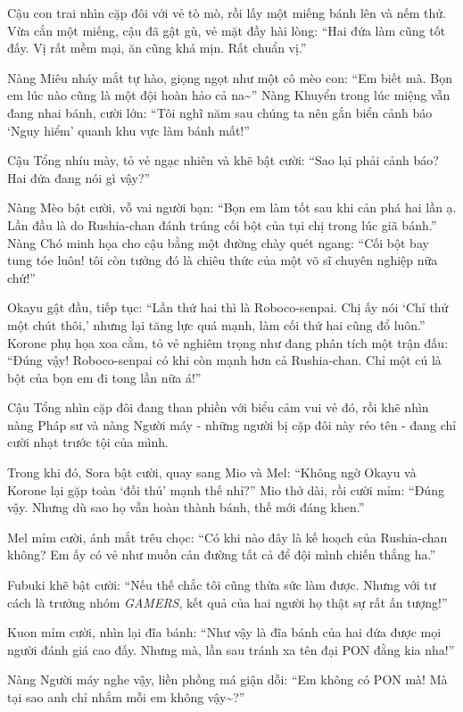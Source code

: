\documentclass[../main.tex]{subfiles}
\begin{document}
Cậu con trai nhìn cặp đôi với vẻ tò mò, rồi lấy một miếng bánh lên và nếm thử. Vừa cắn một miếng, cậu đã gật gù, vẻ mặt đầy hài lòng: ``Hai đứa làm cũng tốt đấy. Vị rất mềm mại, ăn cũng khá mịn. Rất chuẩn vị.''

Nàng Miêu nháy mắt tự hào, giọng ngọt như một cô mèo con: ``Em biết mà. Bọn em lúc nào cũng là một đội hoàn hảo cả na\~{}'' Nàng Khuyển trong lúc miệng vẫn đang nhai bánh, cười lớn: ``Tôi nghĩ năm sau chúng ta nên gắn biển cảnh báo `Nguy hiểm' quanh khu vực làm bánh mất!''

Cậu Tổng nhíu mày, tỏ vẻ ngạc nhiên và khẽ bật cười: ``Sao lại phải cảnh báo? Hai đứa đang nói gì vậy?''

Nàng Mèo bật cười, vỗ vai người bạn: ``Bọn em làm tốt sau khi cản phá hai lần ạ. Lần đầu là do Rushia-chan đánh trúng cối bột của tụi chị trong lúc giã bánh.'' Nàng Chó minh họa cho cậu bằng một đường chày quét ngang: ``Cối bột bay tung tóe luôn! tôi còn tưởng đó là chiêu thức của một võ sĩ chuyên nghiệp nữa chứ!''

Okayu gật đầu, tiếp tục: ``Lần thứ hai thì là Roboco-senpai. Chị ấy nói `Chỉ thử một chút thôi,' nhưng lại tăng lực quá mạnh, làm cối thứ hai cũng đổ luôn.'' Korone phụ họa xoa cằm, tỏ vẻ nghiêm trọng như đang phân tích một trận đấu: ``Đúng vậy! Roboco-senpai có khi còn mạnh hơn cả Rushia-chan. Chỉ một cú là bột của bọn em đi tong lần nữa á!''

Cậu Tổng nhìn cặp đôi đang than phiền với biểu cảm vui vẻ đó, rồi khẽ nhìn nàng Pháp sư và nàng Người máy - những người bị cặp đôi này réo tên - đang chỉ cười nhạt trước tội của mình.

Trong khi đó, Sora bật cười, quay sang Mio và Mel: ``Không ngờ Okayu và Korone lại gặp toàn `đối thủ' mạnh thế nhỉ?'' Mio thở dài, rồi cười mỉm: ``Đúng vậy. Nhưng dù sao họ vẫn hoàn thành bánh, thế mới đáng khen.''

Mel mỉm cười, ánh mắt trêu chọc: ``Có khi nào đây là kế hoạch của Rushia-chan không? Em ấy có vẻ như muốn cản đường tất cả để đội mình chiến thắng ha.''

Fubuki khẽ bật cười: ``Nếu thế chắc tôi cũng thừa sức làm được. Nhưng với tư cách là trưởng nhóm \textit{GAMERS}, kết quả của hai người họ thật sự rất ấn tượng!''

Kuon mỉm cười, nhìn lại đĩa bánh: ``Như vậy là đĩa bánh của hai đứa được mọi người đánh giá cao đấy. Nhưng mà, lần sau tránh xa tên đại PON đằng kia nha!''

Nàng Người máy nghe vậy, liền phồng má giận dỗi: ``Em không có PON mà! Mà tại sao anh chỉ nhắm mỗi em không vậy\~{}?''
\end{document}
